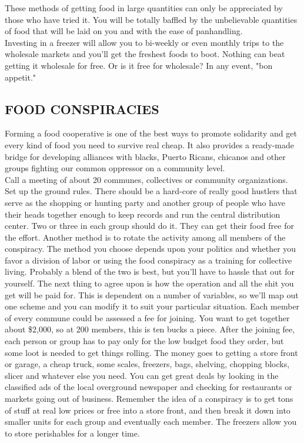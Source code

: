 \documentclass[11pt,twoside,a4paper]{book}
\begin{document}
These methods of getting food in large quantities can only be appreciated by those who have tried it. You will be totally baffled by the unbelievable quantities of food that will be laid on you and with the ease of panhandling.~\\

Investing in a freezer will allow you to bi-weekly or even monthly trips to the wholesale markets and you'll get the freshest foods to boot. Nothing can beat getting it wholesale for free. Or is it free for wholesale? In any event, "bon appetit."~\\ 

\subsection{FOOD CONSPIRACIES}

Forming a food cooperative is one of the best ways to promote solidarity and get every kind of food you need to survive real cheap.	It also provides a ready-made bridge for developing alliances with blacks, Puerto Ricans, chicanos and other groups fighting our common oppressor on a community level.~\\

Call a meeting of about 20 communes, collectives or community organizations. Set up the ground rules. There should be a hard-core of really good hustlers that serve as the shopping or hunting party and another group of people who have their heads together enough to keep records and run the central distribution center. Two or three in each group should do it. They can get their food free for the effort. Another method is to rotate the activity among all members of the conspiracy. The method you choose depends upon your politics and whether you favor a division of labor or using the food conspiracy as a training for collective living. Probably a blend of the two is best, but you'll have to hassle that out for yourself. The next thing to agree upon is how the operation and all the shit you get will be paid for.  This is dependent on a number of variables, so we'll map out one scheme and you can modify it to suit your particular situation. Each member of every commune could be assessed a fee for joining. You want to get together about \$2,000, so at 200 members, this is ten bucks a piece. After the joining fee, each person or group has to pay only for the low budget food they order, but some loot is needed to get things rolling. The money goes to getting a store front or garage, a cheap truck, some scales, freezers, bags, shelving, chopping blocks, slicer and whatever else you need.  You can get great deals by looking in the classified ads of the local overground newspaper and checking for restaurants or markets going out of business. Remember the idea of a conspiracy is to get tons of stuff at real low prices or free into a store front, and then break it down into smaller units for each group and eventually each member. The freezers allow you to store perishables for a longer time.~\\
\end{document}
